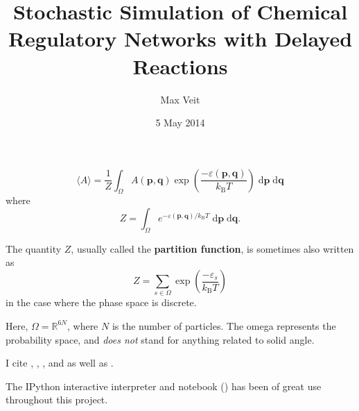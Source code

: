 \documentclass[english,letterpaper,12pt]{article}
\newcommand{\dee}{\;\mathrm{d}}
\renewcommand{\vec}[1]{\ensuremath{\mathbf{#1}}}
\newcommand{\kB}{\ensuremath{k_\mathrm{B}}}
\begin{document}
\title{Stochastic Simulation of Chemical Regulatory Networks with Delayed Reactions}
\author{Max Veit}
\date{5 May 2014}

\maketitle

\begin{doublespacing}

\lipsum[1-2]

\begin{equation}
    \langle A \rangle = \frac{1}{Z} \int_\Omega A(\vec{p}, \vec{q}) \exp\left(\frac{-\varepsilon(\vec{p}, \vec{q})}{\kB T}\right) \dee \vec{p} \dee \vec{q}
\end{equation}
where
\begin{equation}
    Z = \int_\Omega e^{-\varepsilon(\vec{p}, \vec{q}) / \kB T}\dee \vec{p} \dee \vec{q}.
\end{equation}

The quantity $Z$, usually called the \textbf{partition function}, is sometimes also written as
\begin{equation}
    Z = \sum_{s \in \Omega} \exp\left( \frac{-\varepsilon_s}{\kB T} \right)
    \label{eq:partfun-discrete}
\end{equation}
in the case where the phase space is discrete.

Here, $\Omega = \mathbb{R}^{6N}$, where $N$ is the number of particles. The omega represents the probability space, and \emph{does not} stand for anything related to solid angle.

I cite \cite{bistable-modeling}, \cite{we-exact}, \cite{we-chemkin}, and \cite{delay-oscillations} as well as \cite{gillespie-ssa}.

The IPython interactive interpreter and notebook (\cite{PER-GRA:2007}) has been of great use throughout this project.

\lipsum[3-4]

\end{doublespacing}



\end{document}
